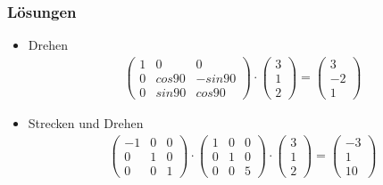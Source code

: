 \begin{frame}
	\frametitle{Lösungen}
	\begin{itemize}
		\item Drehen
		\begin{gather*} \begin{pmatrix}
			1 & 0 & 0 \\
			0 & cos{90} & -sin{90} \\
			0 & sin{90} & cos{90}
			\end{pmatrix} \cdot
			\begin{pmatrix}
				3 \\
				1 \\
				2
				\end{pmatrix} = \begin{pmatrix}
					3 \\
					-2 \\
					1
				\end{pmatrix} \end{gather*}
		\item Strecken und Drehen
		\begin{gather*} \begin{pmatrix}
				-1 & 0 & 0 \\
				0 & 1 & 0 \\
				0 & 0 & 1
				\end{pmatrix} \cdot
				\begin{pmatrix}
					1 & 0 & 0 \\
					0 & 1 & 0 \\
					0 & 0 & 5
				\end{pmatrix} \cdot \begin{pmatrix}
					3 \\
					1 \\
					2
				\end{pmatrix} = \begin{pmatrix}
					-3 \\
					1 \\
					10
				\end{pmatrix} \end{gather*}
	\end{itemize}
\end{frame}
